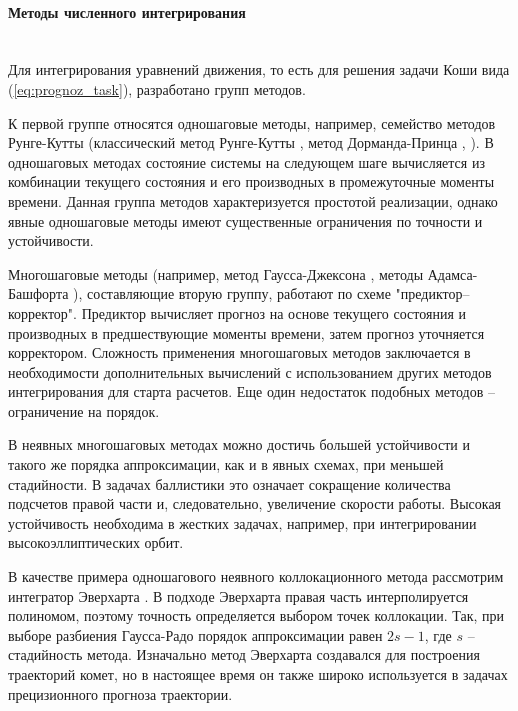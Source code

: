 \newpage
\paragraph{Методы численного интегрирования} \mbox{} \\

Для интегрирования уравнений движения, то есть для решения задачи Коши вида (\ref{eq:prognoz_task}),
разработано групп методов. 

К первой группе относятся одношаговые методы, например,
семейство методов Рунге-Кутты (классический метод Рунге-Кутты \cite{Kutta1901}, метод Дорманда-Принца \cite{Dormand1980}, \cite{Prince1981}).
В одношаговых методах состояние системы на следующем шаге вычисляется из комбинации
текущего состояния и его производных в промежуточные моменты времени. Данная группа
методов характеризуется простотой реализации,
однако явные одношаговые методы имеют существенные ограничения по точности и устойчивости.

Многошаговые методы (например, метод Гаусса-Джексона \cite{Berry2004}, 
методы Адамса-Башфорта \cite{Avdyushev2015}), 
составляющие вторую группу, работают по схеме "предиктор--корректор".
Предиктор вычисляет прогноз на основе текущего состояния и производных в предшествующие
моменты времени, затем прогноз уточняется корректором. Сложность применения 
многошаговых методов заключается в необходимости дополнительных вычислений с использованием
других методов интегрирования для старта расчетов. Еще один недостаток подобных методов -- 
ограничение на порядок.

В неявных многошаговых методах можно достичь большей устойчивости и такого же порядка аппроксимации, 
как и в явных схемах, при меньшей стадийности. В задачах баллистики это означает сокращение количества 
подсчетов правой части и, следовательно, увеличение скорости работы. Высокая устойчивость
необходима в жестких задачах, например, при интегрировании высокоэллиптических орбит.

В качестве примера одношагового неявного коллокационного метода рассмотрим 
интегратор Эверхарта \cite{Everhart1985}. В подходе Эверхарта правая часть интерполируется полиномом,
поэтому точность определяется выбором точек коллокации. Так, при выборе разбиения
Гаусса-Радо порядок аппроксимации равен $2 s - 1$, где $s$ -- стадийность метода.
Изначально метод Эверхарта создавался для построения траекторий комет, 
но в настоящее время он также широко используется в задачах прецизионного прогноза траектории.